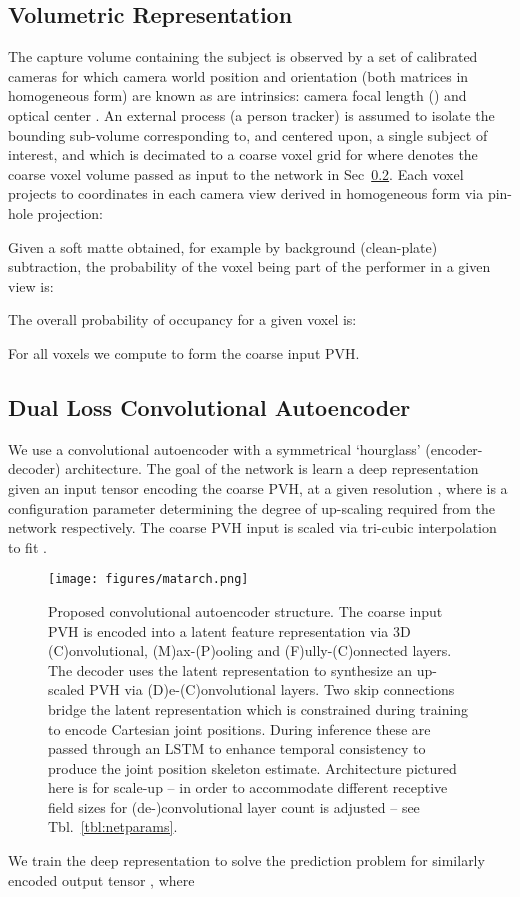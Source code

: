 \documentclass[runningheads]{llncs}
\begin{document}
\subsection {Volumetric Representation}
\label{sec:pvh}
The capture volume  containing the subject is observed by a set of  calibrated cameras  for which camera world position  and orientation  (both matrices in homogeneous form) are known as are intrinsics: camera focal length () and optical center . An external process (\eg a person tracker) is assumed to isolate the bounding sub-volume   corresponding to, and centered upon, a single subject of interest, and which is decimated to a coarse voxel grid  for  where  denotes the coarse voxel volume passed as input to the network in Sec~\ref{sec:autoenc}. Each voxel  projects to coordinates  in each camera view  derived in homogeneous form via pin-hole projection:


Given a soft matte  obtained, for example by background (clean-plate) subtraction, the probability of the voxel being part of the performer in a given view  is: 

The overall probability of occupancy for a given voxel  is:

For all voxels  we compute  to form the coarse input PVH.

\subsection {Dual Loss Convolutional Autoencoder}
\label{sec:autoenc}

We use a convolutional autoencoder with a symmetrical `hourglass' (encoder-decoder) architecture.  The goal of the network is learn a deep representation given an input tensor  encoding the coarse PVH,  at a given resolution , where  is a configuration parameter determining the degree of up-scaling required from the network  respectively.  The coarse PVH input  is scaled via tri-cubic interpolation to fit .
\begin{figure}[t!]
\centering
\texttt{[image: figures/matarch.png]}
\caption{Proposed convolutional autoencoder structure. The coarse input PVH is encoded into a latent feature representation via 3D (C)onvolutional, (M)ax-(P)ooling and (F)ully-(C)onnected layers.  The decoder uses the latent representation to synthesize an up-scaled PVH via (D)e-(C)onvolutional layers.  Two skip connections bridge the latent representation which is constrained during training to encode Cartesian joint positions. During inference these are passed through an LSTM to enhance temporal consistency to produce the joint position skeleton estimate.  Architecture pictured here is for  scale-up -- in order to accommodate different receptive field sizes for  (de-)convolutional layer count is adjusted -- see Tbl.~\ref{tbl:netparams}.
}
\label{fig:netarch}
\squeezeup
\end{figure}
We train the deep representation to solve the prediction problem  for similarly encoded output tensor , where 
\end{document}
